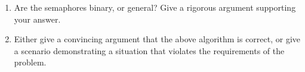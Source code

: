 \begin{enumerate}
\begin{minipage}{3in}
\begin{enumerate}
\item Are the semaphores binary, or general?
Give a rigorous argument supporting your answer.

\item
Either give a convincing argument that the above algorithm is correct,
or give a scenario demonstrating a situation that violates the
requirements of the problem.

\end{enumerate}
\end{minipage}
\end{enumerate}

